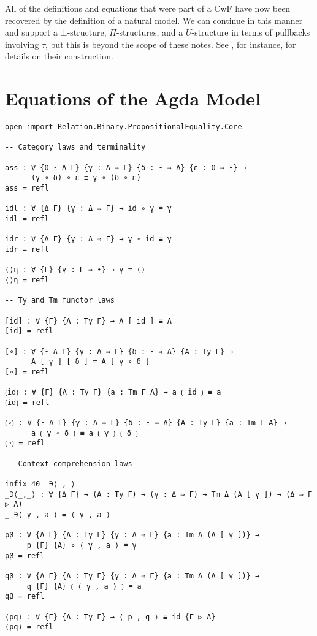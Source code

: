 \documentclass{article}
\renewcommand{\_}{\textrm{\textscale{.5}{\textunderscore}}}
\theoremstyle{definition}
\theoremstyle{plain}
\begin{document}
All of the definitions and equations that were part of a CwF have now been recovered by the definition of a natural model.
We can continue in this manner and support a $\bot$-structure, $\Pi$-structures, and a $U$-structure
in terms of pullbacks involving $\tau$,
but this is beyond the scope of these notes.
See \citet{nat,algnat}, for instance, for details on their construction.

\clearpage

\raggedright


\clearpage
\appendix

\section{Equations of the Agda Model} \label{app:agda}

\begin{verbatim}
open import Relation.Binary.PropositionalEquality.Core

-- Category laws and terminality

ass : ∀ {Θ Ξ Δ Γ} {γ : Δ ⇒ Γ} {δ : Ξ ⇒ Δ} {ε : Θ ⇒ Ξ} →
      (γ ∘ δ) ∘ ε ≡ γ ∘ (δ ∘ ε)
ass = refl

idl : ∀ {Δ Γ} {γ : Δ ⇒ Γ} → id ∘ γ ≡ γ
idl = refl

idr : ∀ {Δ Γ} {γ : Δ ⇒ Γ} → γ ∘ id ≡ γ
idr = refl

⟨⟩η : ∀ {Γ} {γ : Γ ⇒ ∙} → γ ≡ ⟨⟩
⟨⟩η = refl

-- Ty and Tm functor laws

[id] : ∀ {Γ} {A : Ty Γ} → A [ id ] ≡ A
[id] = refl

[∘] : ∀ {Ξ Δ Γ} {γ : Δ ⇒ Γ} {δ : Ξ ⇒ Δ} {A : Ty Γ} →
      A [ γ ] [ δ ] ≡ A [ γ ∘ δ ]
[∘] = refl

⟮id⟯ : ∀ {Γ} {A : Ty Γ} {a : Tm Γ A} → a ⟮ id ⟯ ≡ a
⟮id⟯ = refl

⟮∘⟯ : ∀ {Ξ Δ Γ} {γ : Δ ⇒ Γ} {δ : Ξ ⇒ Δ} {A : Ty Γ} {a : Tm Γ A} →
      a ⟮ γ ∘ δ ⟯ ≡ a ⟮ γ ⟯ ⟮ δ ⟯
⟮∘⟯ = refl

-- Context comprehension laws

infix 40 _∋⟨_,_⟩
_∋⟨_,_⟩ : ∀ {Δ Γ} → (A : Ty Γ) → (γ : Δ ⇒ Γ) → Tm Δ (A [ γ ]) → (Δ ⇒ Γ ▷ A)
_ ∋⟨ γ , a ⟩ = ⟨ γ , a ⟩

pβ : ∀ {Δ Γ} {A : Ty Γ} {γ : Δ ⇒ Γ} {a : Tm Δ (A [ γ ])} →
     p {Γ} {A} ∘ ⟨ γ , a ⟩ ≡ γ
pβ = refl

qβ : ∀ {Δ Γ} {A : Ty Γ} {γ : Δ ⇒ Γ} {a : Tm Δ (A [ γ ])} →
     q {Γ} {A} ⟮ ⟨ γ , a ⟩ ⟯ ≡ a
qβ = refl

⟨pq⟩ : ∀ {Γ} {A : Ty Γ} → ⟨ p , q ⟩ ≡ id {Γ ▷ A}
⟨pq⟩ = refl


\end{verbatim}
\end{document}
